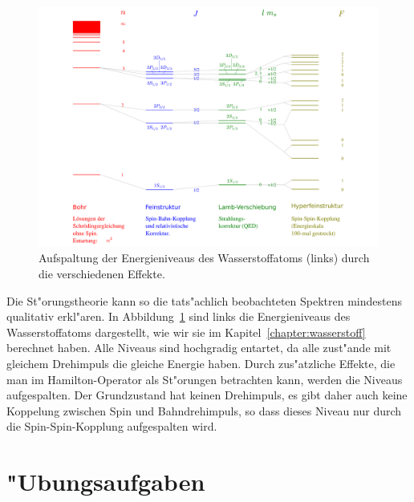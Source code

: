 \begin{figure}
\centering
\includegraphics[width=\hsize]{images/WasserstoffAufspaltung.pdf}
\caption{Aufspaltung der Energieniveaus des Wasserstoffatoms (links)
durch die verschiedenen Effekte.
\label{wasserstoffaufspaltung}}
\end{figure}
Die St"orungstheorie kann so die tats"achlich beobachteten Spektren
mindestens qualitativ erkl"aren.
In Abbildung~\ref{wasserstoffaufspaltung} sind links die Energieniveaus
des Wasserstoffatoms dargestellt, wie wir sie im Kapitel~\ref{chapter:wasserstoff}
berechnet haben.
Alle Niveaus sind hochgradig entartet, da alle zust"ande mit
gleichem Drehimpuls die gleiche Energie haben.
Durch zus"atzliche Effekte, die man im Hamilton-Operator als
St"orungen betrachten kann, werden die Niveaus aufgespalten.
Der Grundzustand hat keinen Drehimpuls, es gibt daher auch keine Koppelung
zwischen Spin und Bahndrehimpuls, so dass dieses Niveau nur durch die 
Spin-Spin-Kopplung aufgespalten wird.

\section{"Ubungsaufgaben}
\begin{uebungsaufgaben}
\item

\item

\end{uebungsaufgaben}
